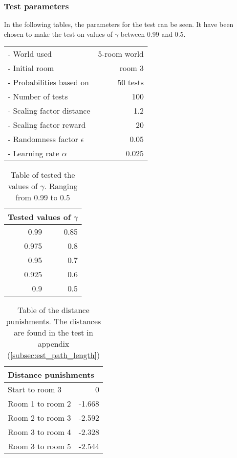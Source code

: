 \documentclass[../Head/Main.tex]{subfiles}
\begin{document}
\subsubsection*{Test parameters}
In the following tables, the parameters for the test can be seen. It have been chosen to make the test on values of $\gamma$ between 0.99 and 0.5.\\
\begin{minipage}[c]{0.35\textwidth}
	\begin{tabular}{l r}
	- World used                   & 5-room world\\
	- Initial room                 & room 3\\	
	- Probabilities based on       & 50 tests\\	
	- Number of tests              & 100\\
	- Scaling factor distance      & 1.2\\
	- Scaling factor reward        & 20\\
	- Randomness factor $\epsilon$ & 0.05\\
	- Learning rate $\alpha$       & 0.025\\
	\end{tabular}
\end{minipage}	
\hfill
\begin{minipage}[c]{0.2\textwidth}
	\begin{table}[H]
		\centering
		\begin{tabular}{r r}
		\hline
		\multicolumn{2}{l}{\textbf{Tested values of $\gamma$}}\\ 			\hline
		0.99   & 0.85\\
		0.975  & 0.8\\
		0.95   & 0.7\\
		0.925  & 0.6\\
		0.9    & 0.5\\
		\hline
		\end{tabular}
		\caption{Table of tested the values of $\gamma$. Ranging from 0.99 to 0.5}
		\label{tab:test_gamma}
	\end{table}
\end{minipage}
\hfill
\begin{minipage}[c]{0.3\textwidth}
	\begin{table}[H]
	\centering
	\begin{tabular}{l r}
		\hline
		\multicolumn{2}{l}{\textbf{Distance punishments}}\\ 			\hline
		Start to room 3   & 0\\
		Room 1 to room 2  & -1.668\\
		Room 2 to room 3  & -2.592\\
		Room 3 to room 4  & -2.328\\
		Room 3 to room 5  & -2.544\\
		\hline
	\end{tabular}
	\caption{Table of the distance punishments. The distances are found in the test in appendix (\ref{subsec:est_path_length})}
	\label{tab:distance_punishment_5_rooms_2}
\end{table}
\end{minipage}
\end{document}
